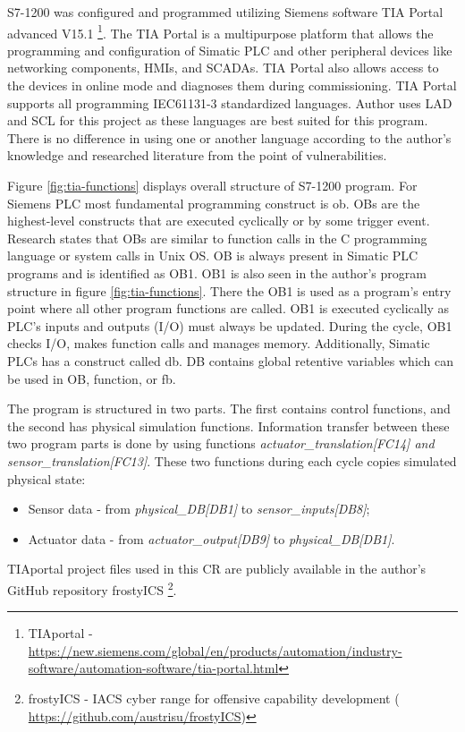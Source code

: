 S7-1200 was configured and programmed utilizing Siemens software TIA Portal advanced V15.1 \footnote{TIAportal -  \url{https://new.siemens.com/global/en/products/automation/industry-software/automation-software/tia-portal.html} }. The TIA Portal is a multipurpose platform that allows the programming and configuration of Simatic PLC and other peripheral devices like networking components, HMIs, and SCADAs. TIA Portal also allows access to the devices in online mode and diagnoses them during commissioning. TIA Portal supports all programming IEC61131-3 \parencite{WEB-14-plc-languages} standardized languages. Author uses LAD and SCL for this project as these languages are best suited for this program. There is no difference in using one or another language according to the author's knowledge and researched literature from the point of vulnerabilities. 

Figure \ref{fig:tia-functions} displays overall structure of S7-1200 program. For Siemens PLC most fundamental programming construct is \gls*{ob}. OBs are the highest-level constructs that are executed cyclically or by some trigger event. Research \parencite{12-ICS-testbed} states that OBs are similar to function calls in the C programming language or system calls in Unix OS. OB is always present in Simatic PLC programs and is identified as OB1. OB1 is also seen in the author's program structure in figure \ref{fig:tia-functions}. There the OB1 is used as a program's entry point where all other program functions are called. OB1 is executed cyclically as PLC's inputs and outputs (I/O) must always be updated. During the cycle, OB1 checks I/O, makes function calls and manages memory. Additionally, Simatic PLCs has a construct called \gls*{db}. DB contains global retentive variables which can be used in OB, \gls*{function}, or \gls*{fb}.

The program is structured in two parts. The first contains control functions, and the second has physical simulation functions. Information transfer between these two program parts is done by using functions \textit{actuator\_translation[FC14] and sensor\_translation[FC13]}. These two functions during each cycle copies simulated physical state:
\begin{itemize}
	\item Sensor data - from \textit{physical\_DB[DB1]} to \textit{sensor\_inputs[DB8]};
	\item Actuator data - from \textit{actuator\_output[DB9]} to \textit{physical\_DB[DB1]}.
\end{itemize}
TIAportal project files used in this CR are publicly available in the author's GitHub repository frostyICS \footnote{frostyICS - IACS cyber range for offensive capability development ( \url{https://github.com/austrisu/frostyICS})}.


